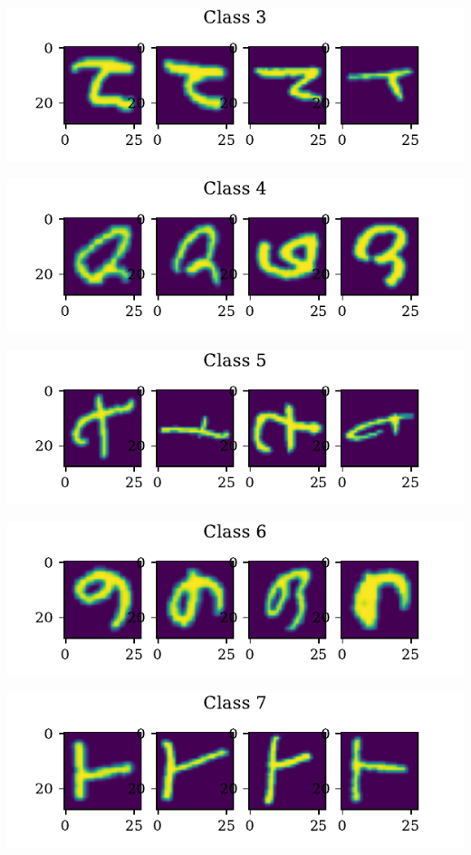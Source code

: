 \documentclass[11pt]{article}
\begin{document}
\includegraphics{figures/1a_sample_class_3.pdf}

\includegraphics{figures/1a_sample_class_4.pdf}

\includegraphics{figures/1a_sample_class_5.pdf}

\includegraphics{figures/1a_sample_class_6.pdf}

\includegraphics{figures/1a_sample_class_7.pdf}
\end{document}
